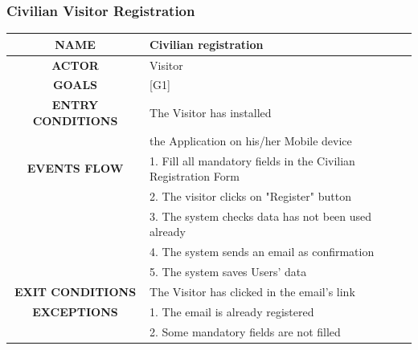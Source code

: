 \documentclass[12pt,a4paper]{article}
\begin{document}
\subsubsection{Civilian Visitor Registration}
		\begin{center}
			\begin{tabular}{| c | l |}
				\hline
				\textbf{NAME} & Civilian registration \\
				\hline
				\textbf{ACTOR} & Visitor \\
				\hline
				\textbf{GOALS} & [G1] \\
				\hline
				\textbf{ENTRY CONDITIONS} & The Visitor has installed \\
				&	the Application on his/her Mobile device \\ \hline
				\textbf{EVENTS FLOW}  &
				1. Fill all mandatory fields in the Civilian Registration Form\\
				&2. The visitor clicks on "Register" button\\
				&3. The system checks data has not been used already\\
				&4. The system sends an email as confirmation\\
				&5. The system saves Users' data\\
				\hline
				\textbf{EXIT CONDITIONS}  & The Visitor has clicked in the email's link\\ \hline
				\textbf{EXCEPTIONS} &
				1. The email is already registered\\
				&2.  Some mandatory fields are not filled\\
				\hline
			\end{tabular}
		\end{center}
\end{document}
